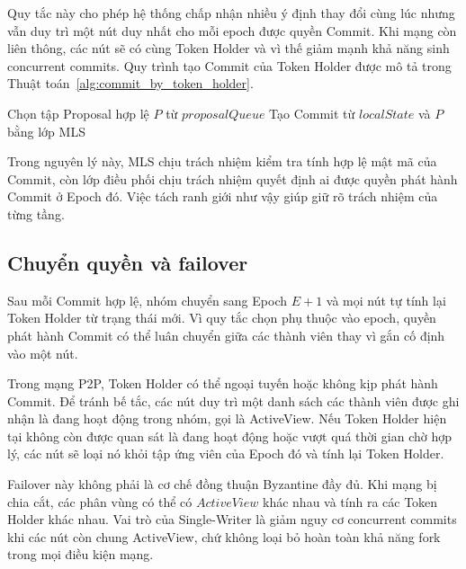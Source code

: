 \documentclass[../DoAn.tex]{subfiles}
\begin{document}
Quy tắc này cho phép hệ thống chấp nhận nhiều ý định thay đổi cùng lúc nhưng vẫn duy trì một nút duy nhất cho mỗi epoch được quyền Commit. Khi mạng còn liên thông, các nút sẽ có cùng Token Holder và vì thế giảm mạnh khả năng sinh concurrent commits. Quy trình tạo Commit của Token Holder được mô tả trong Thuật toán~\ref{alg:commit_by_token_holder}.

\begin{algorithm}[htbp]
\SetAlgoLined
{}
\BlankLine
{}
Chọn tập Proposal hợp lệ $P$ từ $proposalQueue$\;
Tạo Commit từ $localState$ và $P$ bằng lớp MLS\;
\caption{Quy trình tạo Commit của Token Holder ($CommitByTokenHolder$)}
\label{alg:commit_by_token_holder}
\end{algorithm}

Trong nguyên lý này, MLS chịu trách nhiệm kiểm tra tính hợp lệ mật mã của Commit, còn lớp điều phối chịu trách nhiệm quyết định ai được quyền phát hành Commit ở Epoch đó. Việc tách ranh giới như vậy giúp giữ rõ trách nhiệm của từng tầng.

\subsection{Chuyển quyền và failover}

Sau mỗi Commit hợp lệ, nhóm chuyển sang Epoch $E+1$ và mọi nút tự tính lại Token Holder từ trạng thái mới. Vì quy tắc chọn phụ thuộc vào epoch, quyền phát hành Commit có thể luân chuyển giữa các thành viên thay vì gắn cố định vào một nút.

Trong mạng P2P, Token Holder có thể ngoại tuyến hoặc không kịp phát hành Commit. Để tránh bế tắc, các nút duy trì một danh sách các thành viên được ghi nhận là đang hoạt động trong nhóm, gọi là ActiveView. Nếu Token Holder hiện tại không còn được quan sát là đang hoạt động hoặc vượt quá thời gian chờ hợp lý, các nút sẽ loại nó khỏi tập ứng viên của Epoch đó và tính lại Token Holder.

Failover này không phải là cơ chế đồng thuận Byzantine đầy đủ. Khi mạng bị chia cắt, các phân vùng có thể có $ActiveView$ khác nhau và tính ra các Token Holder khác nhau. Vai trò của Single-Writer là giảm nguy cơ concurrent commits khi các nút còn chung ActiveView, chứ không loại bỏ hoàn toàn khả năng fork trong mọi điều kiện mạng.
\end{document}
